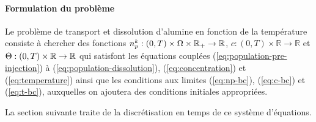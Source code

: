 \paragraph{Formulation du problème}
Le problème de transport et dissolution d'alumine en fonction de la
température consiste à chercher des fonctions $n_p^k:(0,
T)\times\Omega\times\mathbb R_+\to \mathbb R$, $c:(0, T)\times\mathbb R\to
\mathbb R$ et $\Theta:(0, T)\times\mathbb R\to\mathbb R$ qui
satisfont les équations couplées (\ref{eq:population-pre-injection}) à
(\ref{eq:population-dissolution}), (\ref{eq:concentration}) et
(\ref{eq:temperature}) ainsi que les conditions aux limites
(\ref{eq:np-bc}), (\ref{eq:c-bc}) et (\ref{eq:t-bc}), auxquelles on
ajoutera des conditions initiales appropriées.

La section suivante traite de la discrétisation en temps de ce
système d'équations.
